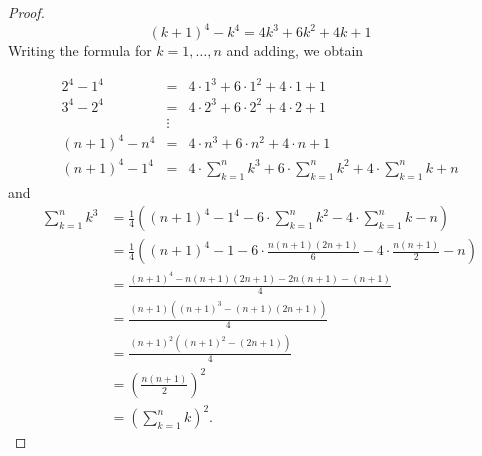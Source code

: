 \documentclass{book}
\theoremstyle{plain}%
\theoremstyle{definition}
\theoremstyle{remark}
\begin{document}
\begin{proof}
	\begin{equation}
		(k + 1)^4 - k^4 = 4 k^3 + 6 k^2 + 4 k + 1
	\end{equation}
	Writing the formula for $k = 1, \dots, n$ and adding, we obtain

	\begin{equation*}
		\begin{array}{rcl}
			2^4 - 1^4       & =      & 4 \cdot 1^3 + 6 \cdot 1^2 + 4 \cdot 1 + 1                                                                                         \\
			3^4 - 2^4       & =      & 4 \cdot 2^3 + 6 \cdot 2^2 + 4 \cdot 2 + 1                                                                                         \\
			                & \vdots &                                                                                                                                   \\
			(n + 1)^4 - n^4 & =      & 4 \cdot n^3 + 6 \cdot n^2 + 4 \cdot n + 1                                                                                         \\
			\hline
			(n + 1)^4 - 1^4 & =      & 4 \cdot \displaystyle\sum_{k = 1}^n k^3 + 6 \cdot \displaystyle\sum_{k = 1}^{n} k^2 + 4 \cdot \displaystyle\sum_{k = 1}^{n} k + n
		\end{array}
	\end{equation*}
	and
	\begin{align*}
		\sum_{k = 1}^n k^3 & = \frac{1}{4} \left((n + 1)^4 - 1^4 - 6 \cdot \sum_{k = 1}^{n} k^2 - 4 \cdot \sum_{k = 1}^{n} k - n \right)       \\
		                   & = \frac{1}{4} \left((n + 1)^4 - 1 - 6 \cdot \frac{n (n + 1) (2n + 1)}{6} - 4 \cdot \frac{n (n + 1)}{2} - n\right) \\
		                   & = \frac{(n + 1)^4 - n (n + 1) (2n + 1) - 2n(n + 1) - (n + 1)}{4}                                                  \\
		                   & = \frac{(n + 1) \left((n + 1)^3 - (n + 1)(2n + 1) \right)}{4}                                                     \\
		                   & = \frac{(n + 1)^2 \left((n + 1)^2 - (2n + 1) \right)}{4}                                                          \\
		                   & = \left(\frac{n (n + 1)}{2}\right)^2                                                                              \\
		                   & = \left(\sum_{k = 1}^{n} k\right)^2 \text{.}
	\end{align*}
\end{proof}
\end{document}
